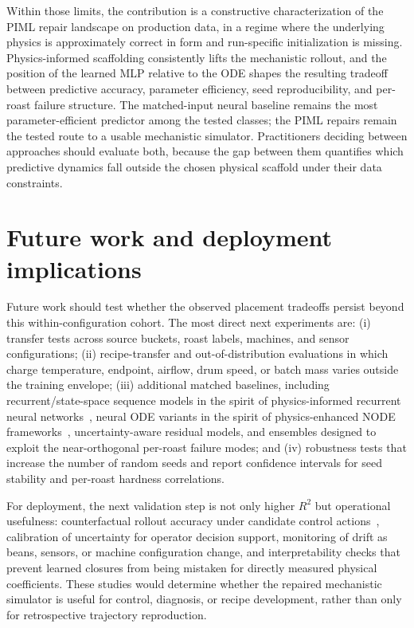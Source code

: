 \documentclass[fleqn,10pt]{wlscirep}
\begin{document}
Within those limits, the contribution is a constructive characterization of the PIML repair landscape on production data, in a regime where the underlying physics is approximately correct in form and run-specific initialization is missing. Physics-informed scaffolding consistently lifts the mechanistic rollout, and the position of the learned MLP relative to the ODE shapes the resulting tradeoff between predictive accuracy, parameter efficiency, seed reproducibility, and per-roast failure structure. The matched-input neural baseline remains the most parameter-efficient predictor among the tested classes; the PIML repairs remain the tested route to a usable mechanistic simulator. Practitioners deciding between approaches should evaluate both, because the gap between them quantifies which predictive dynamics fall outside the chosen physical scaffold under their data constraints.

\section*{Future work and deployment implications}

Future work should test whether the observed placement tradeoffs persist beyond this within-configuration cohort. The most direct next experiments are: (i) transfer tests across source buckets, roast labels, machines, and sensor configurations; (ii) recipe-transfer and out-of-distribution evaluations in which charge temperature, endpoint, airflow, drum speed, or batch mass varies outside the training envelope; (iii) additional matched baselines, including recurrent/state-space sequence models in the spirit of physics-informed recurrent neural networks~\cite{julrasmussen2025}, neural ODE variants in the spirit of physics-enhanced NODE frameworks~\cite{sorourifar2023}, uncertainty-aware residual models, and ensembles designed to exploit the near-orthogonal per-roast failure modes; and (iv) robustness tests that increase the number of random seeds and report confidence intervals for seed stability and per-roast hardness correlations.

For deployment, the next validation step is not only higher $R^2$ but operational usefulness: counterfactual rollout accuracy under candidate control actions~\cite{zheng2023}, calibration of uncertainty for operator decision support, monitoring of drift as beans, sensors, or machine configuration change, and interpretability checks that prevent learned closures from being mistaken for directly measured physical coefficients. These studies would determine whether the repaired mechanistic simulator is useful for control, diagnosis, or recipe development, rather than only for retrospective trajectory reproduction.
\end{document}

